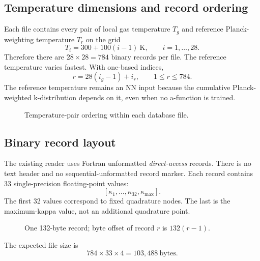 \documentclass[11pt,letterpaper]{article}
\begin{document}
\subsection{Temperature dimensions and record ordering}
Each file contains every pair of local gas temperature $T_g$ and reference
Planck-weighting temperature $T_r$ on the grid
\[
T_i=300+100(i-1)\ \mathrm{K},\qquad i=1,\ldots,28.
\]
Therefore there are $28\times28=784$ binary records per file. The reference
temperature varies fastest. With one-based indices,
\[
\boxed{r=28(i_g-1)+i_r},\qquad 1\leq r\leq784.
\]
The reference temperature remains an NN input because the cumulative
Planck-weighted k-distribution depends on it, even when no a-function is trained.

\begin{figure}[htbp]
\centering
{}
\caption{Temperature-pair ordering within each database file.}
\end{figure}

\subsection{Binary record layout}
The existing reader uses Fortran unformatted \emph{direct-access} records.
There is no text header and no sequential-unformatted record marker. Each
record contains 33 single-precision floating-point values:
\[
[\kappa_1,\ldots,\kappa_{32},\kappa_{\max}].
\]
The first 32 values correspond to fixed quadrature nodes. The last is the
maximum-kappa value, not an additional quadrature point.
\begin{figure}[htbp]
\centering
{}
\caption{One 132-byte record; byte offset of record $r$ is $132(r-1)$.}
\end{figure}
The expected file size is
\[
784\times33\times4=\boxed{103{,}488\ \text{bytes}}.
\]
\end{document}
